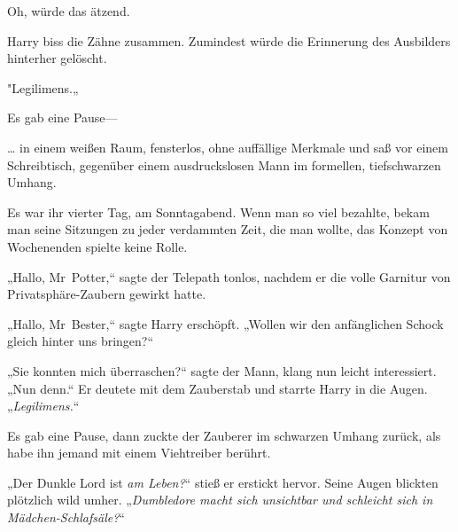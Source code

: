 Oh, würde das ätzend.

Harry biss die Zähne zusammen. Zumindest würde die Erinnerung des Ausbilders hinterher gelöscht.

"Legilimens.„

Es gab eine Pause—

\later

… in einem weißen Raum, fensterlos, ohne auffällige Merkmale und saß vor einem Schreibtisch, gegenüber einem ausdruckslosen Mann im formellen, tiefschwarzen Umhang.

Es war ihr vierter Tag, am Sonntagabend. Wenn man so viel bezahlte, bekam man seine Sitzungen zu jeder verdammten Zeit, die man wollte, das Konzept von Wochenenden spielte keine Rolle.

„Hallo, Mr~Potter,“ sagte der Telepath tonlos, nachdem er die volle Garnitur von Privatsphäre-Zaubern gewirkt hatte.

„Hallo, Mr~Bester,“ sagte Harry erschöpft. „Wollen wir den anfänglichen Schock gleich hinter uns bringen?“

„Sie konnten mich überraschen?“ sagte der Mann, klang nun leicht interessiert. „Nun denn.“ Er deutete mit dem Zauberstab und starrte Harry in die Augen. „\emph{Legilimens.}“

Es gab eine Pause, dann zuckte der Zauberer im schwarzen Umhang zurück, als habe ihn jemand mit einem Viehtreiber berührt.

„Der Dunkle Lord ist \emph{am Leben?}“ stieß er erstickt hervor. Seine Augen blickten plötzlich wild umher. „\emph{Dumbledore macht sich unsichtbar und schleicht sich in Mädchen-Schlafsäle?}“

